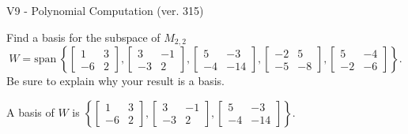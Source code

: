\begin{exercise}
  \begin{exerciseTitle}V9 - Polynomial Computation (ver. 315)\end{exerciseTitle}
  \begin{exerciseStatement}
    Find a basis for the subspace of \(M_{2,2}\) 
\[W=\mathrm{span}\ \left\{\left[\begin{array}{cc}
1 & 3 \\
-6 & 2
\end{array}\right] , \left[\begin{array}{cc}
3 & -1 \\
-3 & 2
\end{array}\right] , \left[\begin{array}{cc}
5 & -3 \\
-4 & -14
\end{array}\right] , \left[\begin{array}{cc}
-2 & 5 \\
-5 & -8
\end{array}\right] , \left[\begin{array}{cc}
5 & -4 \\
-2 & -6
\end{array}\right]\right\}.\]
 Be sure to explain why your result is a basis.


  \end{exerciseStatement}
  \begin{exerciseAnswer}
   A basis of \(W\) is  \(\left\{\left[\begin{array}{cc}
1 & 3 \\
-6 & 2
\end{array}\right] , \left[\begin{array}{cc}
3 & -1 \\
-3 & 2
\end{array}\right] , \left[\begin{array}{cc}
5 & -3 \\
-4 & -14
\end{array}\right]\right\}\).
  


  \end{exerciseAnswer}
\end{exercise}